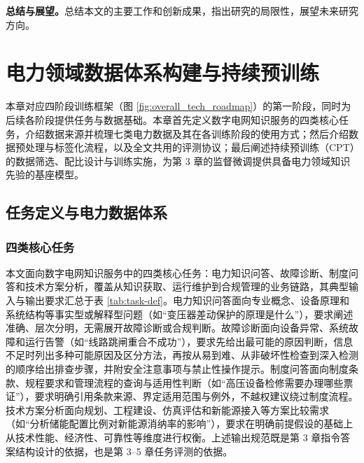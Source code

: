 \documentclass[fontset=fandol,type=master,campus=shenzhen,etitleauto=true]{hithesisbook}
\begin{document}
\textbf{总结与展望。}总结本文的主要工作和创新成果，指出研究的局限性，展望未来研究方向。


\chapter{电力领域数据体系构建与持续预训练}\label{ux9762ux5411ux7535ux529bux77e5ux8bc6ux670dux52a1ux7684ux5927ux8bedux8a00ux6a21ux578bux603bux4f53ux6846ux67b6}

本章对应四阶段训练框架（图 \ref{fig:overall_tech_roadmap}）的第一阶段，同时为后续各阶段提供任务与数据基础。本章首先定义数字电网知识服务的四类核心任务，介绍数据来源并梳理七类电力数据及其在各训练阶段的使用方式；然后介绍数据预处理与标签化流程，以及全文共用的评测协议；最后阐述持续预训练（CPT）的数据筛选、配比设计与训练实施，为第 3 章的监督微调提供具备电力领域知识先验的基座模型。

\section{任务定义与电力数据体系}\label{sec:task-data}

\subsection{四类核心任务}\label{ux4efbux52a1ux5b9aux4e49}

本文面向数字电网知识服务中的四类核心任务：电力知识问答、故障诊断、制度问答和技术方案分析，覆盖从知识获取、运行维护到合规管理的业务链路，其典型输入与输出要求汇总于表 \ref{tab:task-def}。电力知识问答面向专业概念、设备原理和系统结构等事实型或解释型问题（如``变压器差动保护的原理是什么''），要求阐述准确、层次分明，无需展开故障诊断或合规判断。故障诊断面向设备异常、系统故障和运行告警（如``线路跳闸重合不成功''），要求先给出最可能的原因判断，信息不足时列出多种可能原因及区分方法，再按从易到难、从非破坏性检查到深入检测的顺序给出排查步骤，并附安全注意事项与禁止性操作提示。制度问答面向制度条款、规程要求和管理流程的查询与适用性判断（如``高压设备检修需要办理哪些票证''），要求明确引用条款来源、界定适用范围与例外，不越权建议绕过制度流程。技术方案分析面向规划、工程建设、仿真评估和新能源接入等方案比较需求（如``分析储能配置比例对新能源消纳率的影响''），要求在明确前提假设的基础上从技术性能、经济性、可靠性等维度进行权衡。上述输出规范既是第 3 章指令答案结构设计的依据，也是第 3--5 章任务评测的依据。
\end{document}
